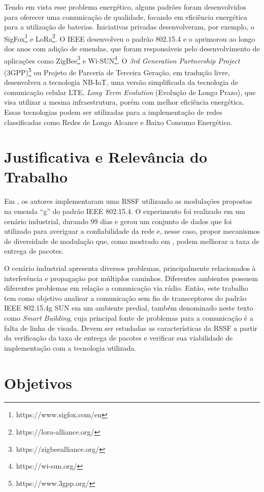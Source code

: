 Tendo em vista esse problema energético, alguns padrões foram desenvolvidos para oferecer uma comunicação de qualidade, focando em eficiência energética para a utilização de baterias. Iniciativas privadas desenvolveram, por exemplo, o SigFox\footnote{https://www.sigfox.com/en} e LoRa\footnote{https://lora-alliance.org/}. O IEEE desenvolveu o padrão 802.15.4 e o aprimorou ao longo dos anos com adição de emendas, que foram responsáveis pelo desenvolvimento de aplicações como ZigBee\footnote{https://zigbeealliance.org/} e Wi-SUN\footnote{https://wi-sun.org/}. O \emph{3rd Generation Partnership Project} (3GPP)\footnote{https://www.3gpp.org/} ou Projeto de Parceria de Terceira Geração, em tradução livre, desenvolveu a tecnologia NB-IoT, uma versão simplificada da tecnologia de comunicação celular LTE, \emph{Long Term Evolution} (Evolução de Longo Prazo), que visa utilizar a mesma infraestrutura, porém com melhor eficiência energética. Essas tecnologias podem ser utilizadas para a implementação de redes classificadas como Redes de Longo Alcance e Baixo Consumo Energético.

\section{Justificativa e Relevância do Trabalho}
\label{sec:justificativa}
Em \cite{tuset2020dataset}, os autores implementaram uma RSSF utilizando as modulações propostas na emenda ``g'' do padrão IEEE 802.15.4. O experimento foi realizado em um cenário industrial, durando 99 dias e gerou um conjunto de dados que foi utilizado para averiguar a confiabilidade da rede e, nesse caso, propor mecanismos de diversidade de modulação que, como mostrado em \cite{gomes2020improving}, podem melhorar a taxa de entrega de pacotes.

O cenário industrial apresenta diversos problemas, principalmente relacionados à interferência e propagação por múltiplos caminhos. Diferentes ambientes possuem diferentes problemas em relação a comunicação via rádio. Então, este trabalho tem como objetivo analisar a comunicação sem fio de transceptores do padrão IEEE 802.15.4g SUN em um ambiente predial, também denominado neste texto como \emph{Smart Building}, cuja principal fonte de problemas para a comunicação é a falta de linha de visada. Devem ser estudadas as características da RSSF a partir da verificação da taxa de entrega de pacotes e verificar sua viabilidade de implementação com a tecnologia utilizada.

\section{Objetivos}
\label{sec:objetivos}

